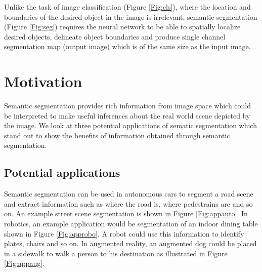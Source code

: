 Unlike the task of image classification (Figure \ref{Fig:cls}), where the location and boundaries of the desired object in the image is irrelevant, semantic segmentation (Figure \ref{Fig:seg}) requires the neural network to be able to spatially localize desired objects, delineate object boundaries and produce single channel segmentation map (output image) which is of the same size as the input image.

\section{Motivation}

Semantic segmentation provides rich information from image space which could be interpreted to make useful inferences about the real world scene depicted by the image. We look at three potential applications of sematic segmentation which stand out to show the benefits of information obtained through semantic segmentation. 

\subsection{Potential applications}

Semantic segmentation can be used in autonomous cars to segment a road scene and extract information such as where the road is, where pedestrains are and so on. An example street scene segmentation is shown in Figure \ref{Fig:appauto}. In robotics, an example application would be segmentation of an indoor dining table shown in Figure \ref{Fig:approbo}. A robot could use this information to identify plates, chairs and so on. In augmented reality, an augmented dog could be placed in a sidewalk to walk a person to his destination as illustrated in Figure \ref{Fig:appaug}. 

